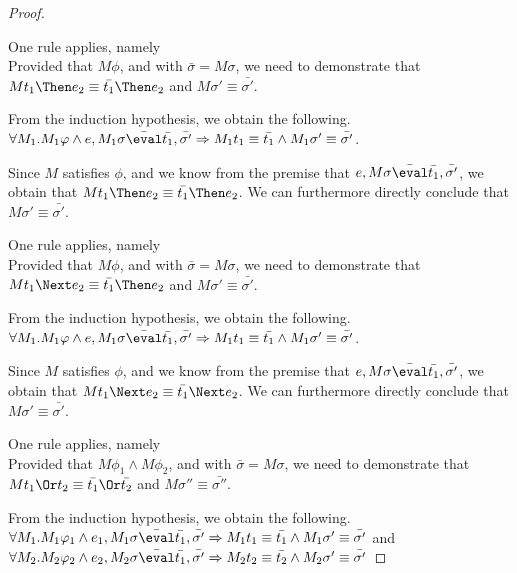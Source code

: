 \begin{proof}
{  }

  {One rule applies, namely \\
  Provided that $M\phi$, and  with $\bar{\sigma}=M\sigma$,
  we need to demonstrate that $M t_1\Then e_2 \equiv \bar{t_1}\Then e_2$ and $M\sigma'\equiv\bar{\sigma'}$.

  From the induction hypothesis, we obtain the following.\\
  $\forall M_1 .  M_1\phi \land e, M_1\sigma \bar{\eval}\bar{t_1},\bar{\sigma'}\implies  M_1 t_1\equiv \bar{t_1} \land  M_1\sigma'\equiv\bar{\sigma'}$.

  Since $M$ satisfies $\phi$,
  and we know from the premise that $e,M\sigma \bar{\eval}\bar{t_1},\bar{\sigma'}$,
  we obtain that $M t_1\Then e_2 \equiv \bar{t_1}\Then e_2$.
  We can furthermore directly conclude that $M \sigma' \equiv\bar{\sigma'}$.

  }

  {One rule applies, namely \\
  Provided that $M\phi$, and  with $\bar{\sigma}=M\sigma$,
  we need to demonstrate that $M t_1\Next e_2 \equiv \bar{t_1}\Then e_2$ and $M\sigma'\equiv\bar{\sigma'}$.

  From the induction hypothesis, we obtain the following.\\
  $\forall M_1 .  M_1\phi \land e, M_1\sigma \bar{\eval}\bar{t_1},\bar{\sigma'}\implies  M_1 t_1\equiv \bar{t_1} \land  M_1\sigma'\equiv\bar{\sigma'}$.

  Since $M$ satisfies $\phi$,
  and we know from the premise that $e,M\sigma \bar{\eval}\bar{t_1},\bar{\sigma'}$,
  we obtain that $M t_1\Next e_2 \equiv \bar{t_1}\Next e_2$.
  We can furthermore directly conclude that $M \sigma' \equiv\bar{\sigma'}$.

  }

  {One rule applies, namely \\
  Provided that $M\phi_1\wedge M\phi_2$, and  with $\bar{\sigma}=M\sigma$,
  we need to demonstrate that $M t_1\Or t_2 \equiv \bar{t_1}\Or\bar{t_2}$ and $M\sigma''\equiv\bar{\sigma''}$.

  From the induction hypothesis, we obtain the following.\\
  $\forall M_1 .  M_1\phi_1 \wedge e_1, M_1\sigma \bar{\eval}\bar{t_1},\bar{\sigma'}\implies  M_1 t_1\equiv \bar{t_1} \wedge  M_1\sigma'\equiv\bar{\sigma'}$ and\\
  $\forall M_2 . M_2\phi_2 \wedge e_2,M_2\sigma \bar{\eval}\bar{t_1},\bar{\sigma'}\implies M_2t_2\equiv \bar{t_2} \wedge M_2\sigma'\equiv\bar{\sigma'}$

}
\end{proof}
